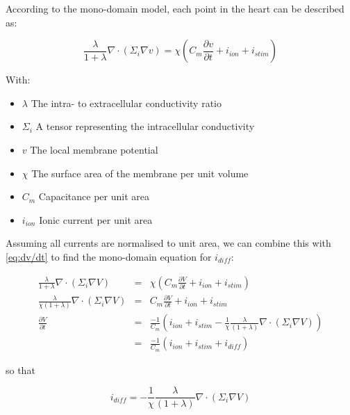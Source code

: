 According to the mono-domain model, each point in the heart can be
described as:
\begin{linenomath}
\begin{equation}
\frac{\lambda}{1+\lambda}\nabla\cdot\left(\Sigma_{i}\nabla v\right)=\chi\left(C_{m}\frac{\partial v}{\partial t}+i_{\mathit{ion}}+i_{\mathit{stim}}\right)\label{eq:monodom}
\end{equation}
\end{linenomath}
With:
\begin{itemize}
\item $\lambda$ The intra- to extracellular conductivity ratio
\item $\Sigma_{i}$ A tensor representing the intracellular conductivity
\item $v$ The local membrane potential
\item $\chi$ The surface area of the membrane per unit volume
\item $C_{m}$ Capacitance per unit area
\item $i_{ion}$ Ionic current per unit area
\end{itemize}
Assuming all currents are normalised to unit area, we can combine
this with \ref{eq:dv/dt} to find the mono-domain equation for $i_{diff}$:
\begin{linenomath}
\begin{eqnarray*}
\frac{\lambda}{1+\lambda}\nabla\cdot\left(\Sigma_{i}\nabla V\right) & = & \chi\left(C_{m}\frac{\partial V}{\partial t}+i_{\mathit{ion}}+i_{\mathit{stim}}\right)\\
\frac{\lambda}{\chi\left(1+\lambda\right)}\nabla\cdot\left(\Sigma_{i}\nabla V\right) & = & C_{m}\frac{\partial V}{\partial t}+i_{\mathit{ion}}+i_{\mathit{stim}}\\
\frac{\partial V}{\partial t} & = & \frac{-1}{C_{m}}\left(i_{\mathit{ion}}+i_{\mathit{stim}}-\frac{1}{\chi}\frac{\lambda}{\left(1+\lambda\right)}\nabla\cdot\left(\Sigma_{i}\nabla V\right)\right)\\
 & = & \frac{-1}{C_{m}}\left(i_{\mathit{ion}}+i_{\mathit{stim}}+i_{\mathit{diff}}\right)
\end{eqnarray*}
\end{linenomath}
so that
\begin{linenomath}
\begin{equation}
i_{\mathit{diff}}=-\frac{1}{\chi}\frac{\lambda}{\left(1+\lambda\right)}\nabla\cdot\left(\Sigma_{i}\nabla V\right)
\end{equation}
\end{linenomath}
